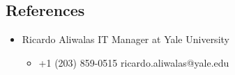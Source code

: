 \documentclass[letterpaper]{article}
\providecommand{\tightlist}{%
  \setlength{\itemsep}{0pt}\setlength{\parskip}{0pt}}
\begin{document}
\hypertarget{references}{%
\subsection{References}\label{references}}

\begin{itemize}
\tightlist
\item
  Ricardo Aliwalas \textbar{} IT Manager at Yale University

  \begin{itemize}
  \tightlist
  \item
    +1 (203) 859-0515 \textbar{} ricardo.aliwalas@yale.edu
  \end{itemize}
\end{itemize}
\end{document}
